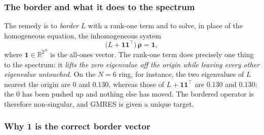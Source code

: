 \documentclass[12pt]{article}
\newcommand{\R}{\mathbb{R}}
\newcommand{\brho}{\boldsymbol{\rho}}
\theoremstyle{definition}
\theoremstyle{remark}
\begin{document}
\subsubsection*{The border and what it does to the spectrum}

The remedy is to \emph{border} $L$ with a rank-one term and to solve, in place of the homogeneous equation, the inhomogeneous system
\[
\big(L + \mathbf{1}\mathbf{1}^\top\big)\,\brho = \mathbf{1},
\]
where $\mathbf{1} \in \R^{2^N}$ is the all-ones vector. The rank-one term does precisely one thing to the spectrum: it \emph{lifts the zero eigenvalue off the origin while leaving every other eigenvalue untouched}. On the $N = 6$ ring, for instance, the two eigenvalues of $L$ nearest the origin are $0$ and $0.130$, whereas those of $L + \mathbf{1}\mathbf{1}^\top$ are $0.130$ and $0.130$: the $0$ has been pushed up and nothing else has moved. The bordered operator is therefore non-singular, and GMRES is given a unique target.

\subsubsection*{Why $\mathbf{1}$ is the correct border vector}
\end{document}
